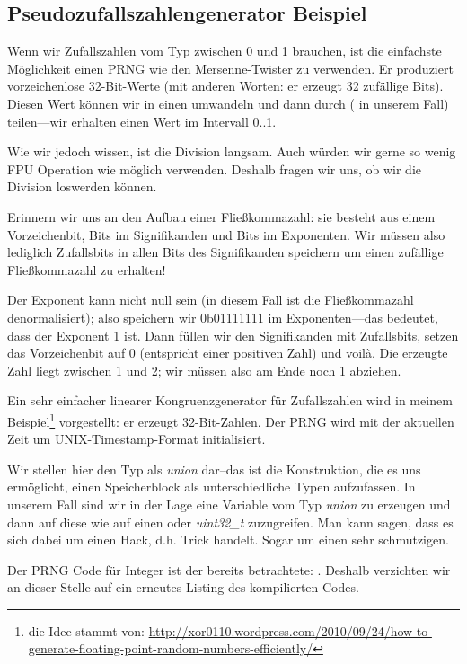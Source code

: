 \subsection{Pseudozufallszahlengenerator Beispiel}
\label{FPU_PRNG}
Wenn wir Zufallszahlen vom Typ \Tfloat zwischen 0 und 1 brauchen, ist die einfachste Möglichkeit einen \ac{PRNG} wie den
Mersenne-Twister zu verwenden.
Er produziert vorzeichenlose 32-Bit-Werte (mit anderen Worten: er erzeugt 32 zufällige Bits).
Diesen Wert können wir in einen \Tfloat umwandeln und dann durch  ( in unserem Fall)
teilen---wir erhalten einen Wert im Intervall 0..1.

Wie wir jedoch wissen, ist die Division langsam.
Auch würden wir gerne so wenig FPU Operation wie möglich verwenden.
Deshalb fragen wir uns, ob wir die Division loswerden können.

Erinnern wir uns an den Aufbau einer Fließkommazahl: sie besteht aus einem Vorzeichenbit, Bits im Signifikanden und Bits
im Exponenten.
Wir müssen also lediglich Zufallsbits in allen Bits des Signifikanden speichern um einen zufällige Fließkommazahl zu
erhalten!

Der Exponent kann nicht null sein (in diesem Fall ist die Fließkommazahl denormalisiert); also speichern wir 0b01111111
im Exponenten---das bedeutet, dass der Exponent 1 ist.
Dann füllen wir den Signifikanden mit Zufallsbits, setzen das Vorzeichenbit auf 0 (entspricht einer positiven Zahl) und
voilà.
Die erzeugte Zahl liegt zwischen 1 und 2; wir müssen also am Ende noch 1 abziehen.

\newcommand{\URLXOR}{\url{http://xor0110.wordpress.com/2010/09/24/how-to-generate-floating-point-random-numbers-efficiently/}}
Ein sehr einfacher linearer Kongruenzgenerator für Zufallszahlen wird in meinem Beispiel\footnote{die Idee stammt von:
\URLXOR} vorgestellt: er erzeugt 32-Bit-Zahlen.
Der \ac{PRNG} wird mit der aktuellen Zeit um UNIX-Timestamp-Format initialisiert.

Wir stellen hier den Typ \Tfloat als \emph{union} dar--das ist die \CCpp Konstruktion, die es uns ermöglicht, einen
Speicherblock als unterschiedliche Typen aufzufassen.
In unserem Fall sind wir in der Lage eine Variable vom Typ \emph{union} zu erzeugen und dann auf diese wie auf einen
\Tfloat oder \emph{uint32\_t} zuzugreifen.
Man kann sagen, dass es sich dabei um einen Hack, d.h. Trick handelt. Sogar um einen sehr schmutzigen.

Der \ac{PRNG} Code für Integer ist der bereits betrachtete: .
Deshalb verzichten wir an dieser Stelle auf ein erneutes Listing des kompilierten Codes.

